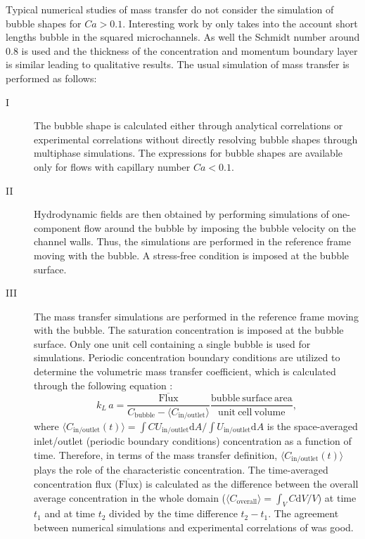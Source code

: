 \documentclass[review,12pt]{elsarticle}
\newcommand{\vol}{k_L\,a}
\newcommand{\uinoutlet}{U_{\mathrm{in/outlet}}}
\newcommand{\cbubble}{C_{\mathrm{bubble}}}
\newcommand{\cinoutlet}{C_{\mathrm{in/outlet}}}
\newcommand{\coverall}{C_{\mathrm{overall}}}
\begin{document}
Typical numerical studies of mass transfer
\cite{kreutzer-overview,vanbaten-circular} do not consider the simulation of
bubble shapes for $Ca>0.1$. {\color{red} Interesting work by \citet{onea-mass} only takes into the account short lengths bubble in the squared microchannels. As well the Schmidt number around $0.8$ is  used and the thickness of the concentration and momentum boundary layer is similar leading to qualitative results.} The usual simulation of mass transfer is performed as
follows: 
\begin{description}
 \item[I] The bubble shape is calculated either
through analytical correlations \cite{bretherton} or experimental correlations
\cite{cerro-bubble-train} without directly resolving bubble shapes through
multiphase simulations.  The expressions for bubble shapes are available only
for flows with capillary number $Ca<0.1$.
  \item[II] Hydrodynamic fields
are then obtained by performing simulations of one-component flow around the
bubble by imposing the bubble velocity on the channel walls. Thus, the simulations are
performed in the reference frame moving with the bubble. A stress-free
condition is imposed at the bubble surface.
  \item[III]  The mass transfer
simulations are performed in the reference frame moving with the bubble. The
saturation concentration is imposed at the bubble surface. Only one unit cell
containing a single bubble is used for simulations. Periodic concentration boundary conditions are
utilized to determine the volumetric mass transfer coefficient, which is
calculated through the following equation \cite{vanbaten-circular}:
\begin{equation} \label{main:simulation:equation}
\vol=\frac{\mathrm{\overline{Flux}}}{\cbubble-\langle\cinoutlet\rangle}
\frac{\mathrm{bubble\ surface\ area}}{\mathrm{unit\ cell\ volume}},
\end{equation}
 where $\langle\cinoutlet(t)\rangle=\int{C \uinoutlet
\mathrm{d}A}/\int{\uinoutlet\mathrm{d}A}$ is the space-averaged inlet/outlet (periodic boundary conditions)
concentration as a function of time. Therefore, in terms of the mass transfer definition, $\langle\cinoutlet(t)\rangle$ plays the role of the 
characteristic concentration.
The time-averaged
concentration flux ($\mathrm{\overline{Flux}}$) is calculated as the difference
between the overall average concentration in the whole domain
($\langle\coverall\rangle=\int_{V} C \mathrm{d}V /V$) at time $t_1$ and at time
$t_2$ divided by the time difference $t_2-t_1$. The agreement between numerical
simulations \cite{vanbaten-circular} and experimental correlations of \citet{bercic-mass}
was good. 
 \end{description}
\end{document}
